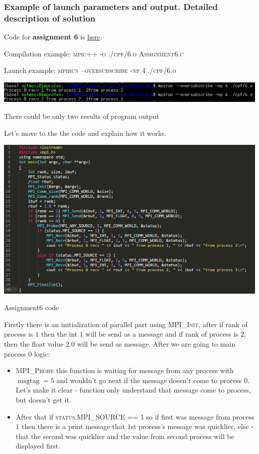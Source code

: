 \documentclass[%
12pt, %
final, %
oneside, %
onecolumn, %
centertags]{article} %
\theoremstyle{plain}
\theoremstyle{definition}
\theoremstyle{remark}
\begin{document}
\subsubsection{Example of launch parameters and output. Detailed description of solution}

Code for \textbf{assignment 6} is \href{https:\//github.com/aptmess/parallel_algorithms/blob/master/HT/hw_mpi/Assignment6.c}{here}.

Compilation example: \textsc{mpic++ -o ./cpf/6.o Assignment6.c}

Launch example: \textsc{mpirun --oversubscribe -np 4 ./cpf/6.o}

\begin{center}
\includegraphics[scale=0.7]{6.1.png}

There could be only two results of program output
\end{center}

Let's move to the the code and explain how it works.

\begin{center}
\includegraphics[scale=0.9]{6.code.png}

Assignment6 code
\end{center}

Firstly there is an initialization of parallel part using \textsc{MPI\_Init}, after if rank of process is $1$ then the int $1$ will be send as a message and if rank of process is $2$, then the float value $2.0$ will be send as message. After we are going to main process $0$ logic: 

\begin{itemize}
	\item \textsc{MPI\_Probe} this function is waiting for message from any process with $\operatorname{msgtag}=5$ and wouldn't go next if the message doesn't come to process $0$. Let's make it clear - function only understand that message come to process, but doesn't get it.
	\item After that if \textsc{status.MPI\_SOURCE == 1} so if first was message from process $1$ then there is a print message that $1$st process's message was quicklier, else - that the second was quicklier and the value from second process will be displayed first.
\end{itemize}
\end{document}
